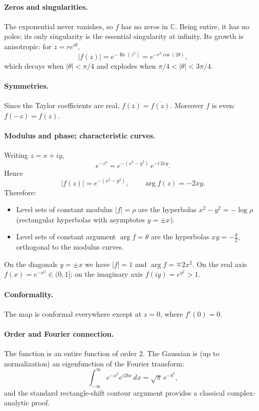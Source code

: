 \documentclass[11pt]{article}
\begin{document}
\paragraph{Zeros and singularities.}
The exponential never vanishes, so $f$ has no zeros in $\mathbb C$. Being entire, it has no poles; its only singularity is the essential singularity at infinity. Its growth is anisotropic: for $z=re^{i\theta}$,
\[
|f(z)|=e^{-\operatorname{Re}(z^{2})}=e^{-r^{2}\cos(2\theta)},
\]
which decays when $|\theta|<\pi/4$ and explodes when $\pi/4<|\theta|<3\pi/4$.

\paragraph{Symmetries.}
Since the Taylor coefficients are real, $f(\overline{z})=\overline{f(z)}$.
Moreover $f$ is even: $f(-z)=f(z)$.

\paragraph{Modulus and phase; characteristic curves.}
Writing $z=x+iy$,
\[
e^{-z^{2}}=e^{-(x^{2}-y^{2})}\,e^{-i\,2xy}.
\]
Hence
\[
|f(z)|=e^{-(x^{2}-y^{2})},\qquad \arg f(z)=-2xy.
\]
Therefore:
\begin{itemize}
	\item Level sets of constant modulus $|f|=\rho$ are the hyperbolas $x^{2}-y^{2}=-\log \rho$ (rectangular hyperbolas with asymptotes $y=\pm x$).
	\item Level sets of constant argument $\arg f=\theta$ are the hyperbolas $xy=-\tfrac{\theta}{2}$, orthogonal to the modulus curves.
\end{itemize}
On the diagonals $y=\pm x$ we have $|f|=1$ and $\arg f=\mp 2x^{2}$. On the real axis $f(x)=e^{-x^{2}}\in(0,1]$; on the imaginary axis $f(iy)=e^{y^{2}}>1$.

\paragraph{Conformality.}
The map is conformal everywhere except at $z=0$, where $f'(0)=0$.

\paragraph{Order and Fourier connection.}
The function is an entire function of order $2$. The Gaussian is (up to normalization) an eigenfunction of the Fourier transform:
\[
\int_{-\infty}^{\infty}e^{-x^{2}}e^{i2bx}\,dx=\sqrt{\pi}\,e^{-b^{2}},
\]
and the standard rectangle-shift contour argument provides a classical complex-analytic proof.
\end{document}
